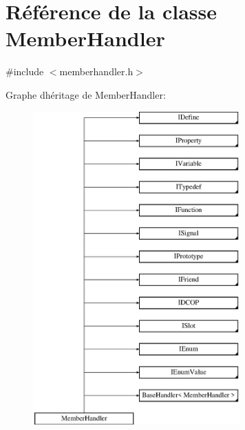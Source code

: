 \hypertarget{class_member_handler}{}\section{Référence de la classe Member\+Handler}
\label{class_member_handler}


{\ttfamily \#include $<$memberhandler.\+h$>$}

Graphe d\textquotesingle{}héritage de Member\+Handler\+:\begin{figure}[H]
\begin{center}
\leavevmode
\includegraphics[height=12.000000cm]{class_member_handler}
\end{center}
\end{figure}

